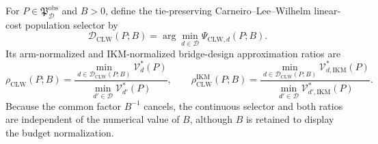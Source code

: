 For \(P\in\mathfrak P_{\mathcal D}^{\mathrm{obs}}\) and \(B>0\), define the tie-preserving Carneiro--Lee--Wilhelm linear-cost population selector by
\[
\mathcal D_{\mathrm{CLW}}(P;B)
=\arg\min_{d\in\mathcal D}\Psi_{\mathrm{CLW},d}(P;B).
\]
Its arm-normalized and IKM-normalized bridge-design approximation ratios are
\[
\rho_{\mathrm{CLW}}(P;B)
=\frac{\min_{d\in\mathcal D_{\mathrm{CLW}}(P;B)}\mathcal V_d^*(P)}
{\min_{d'\in\mathcal D}\mathcal V_{d'}^*(P)},
\qquad
\rho_{\mathrm{CLW}}^{\mathrm{IKM}}(P;B)
=\frac{\min_{d\in\mathcal D_{\mathrm{CLW}}(P;B)}\mathcal V_{d,\mathrm{IKM}}^*(P)}
{\min_{d'\in\mathcal D}\mathcal V_{d',\mathrm{IKM}}^*(P)}.
\]
Because the common factor \(B^{-1}\) cancels, the continuous selector and both ratios are independent of the numerical value of \(B\), although \(B\) is retained to display the budget normalization.
